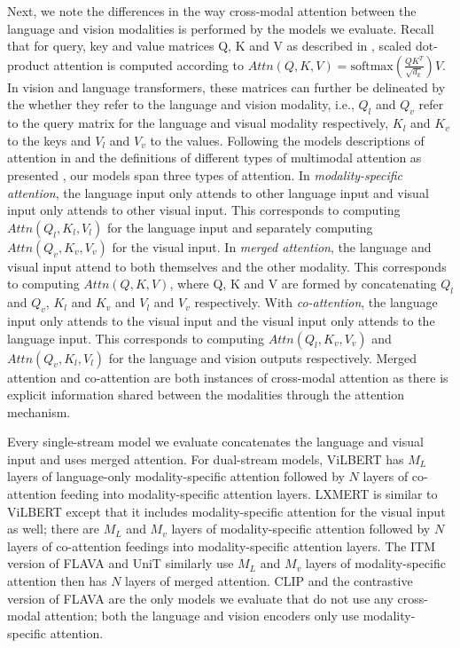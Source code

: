 \documentclass[10pt,twocolumn,letterpaper]{article}
\begin{document}
Next, we note the differences in the way cross-modal attention between the language and vision modalities is performed by the models we evaluate.
Recall that for query, key and value matrices Q, K and V as described in \cite{vaswani2017attention}, scaled dot-product attention is computed according to $Attn(Q, K, V) = \text{softmax} \left( \frac{QK^{T}}{\sqrt{d_{k}}} \right) V$.
In vision and language transformers, these matrices can further be delineated by the whether they refer to the language and vision modality, i.e., $Q_{l}$ and $Q_{v}$ refer to the query matrix for the language and visual modality respectively, $K_{l}$ and $K_{v}$ to the keys and $V_{l}$ and $V_{v}$ to the values.
Following the models descriptions of attention in \cite{vaswani2017attention} and the definitions of different types of multimodal attention as presented \cite{hendricks2021decoupling}, our models span three types of attention. In \textit{modality-specific attention}, the language input only attends to other language input and visual input only attends to other visual input. This corresponds to computing $Attn(Q_{l}, K_{l}, V_{l})$ for the language input and separately computing $Attn(Q_{v}, K_{v}, V_{v})$ for the visual input. In \textit{merged attention}, the language and visual input attend to both themselves and the other modality. This corresponds to computing $Attn(Q, K, V)$, where Q, K and V are formed by concatenating $Q_{l}$ and $Q_{v}$, $K_{l}$ and $K_{v}$ and $V_{l}$ and $V_{v}$ respectively. With \textit{co-attention}, the language input only attends to the visual input and the visual input only attends to the language input. This corresponds to computing $Attn(Q_{l}, K_{v}, V_{v})$ and $Attn(Q_{v}, K_{l}, V_{l})$ for the language and vision outputs respectively. Merged attention and co-attention are both instances of cross-modal attention as there is explicit information shared between the modalities through the attention mechanism.


Every single-stream model we evaluate concatenates the language and visual input and uses merged attention.
For dual-stream models, ViLBERT has $M_{L}$ layers of language-only modality-specific attention followed by $N$ layers of co-attention feeding into modality-specific attention layers.
LXMERT is similar to ViLBERT except that it includes modality-specific attention for the visual input as well; there are $M_{L}$ and $M_{v}$ layers of modality-specific attention followed by $N$ layers of co-attention feedings into modality-specific attention layers.
The ITM version of FLAVA and UniT similarly use $M_{L}$ and $M_{v}$ layers of modality-specific attention then has $N$ layers of merged attention.
CLIP and the contrastive version of FLAVA are the only models we evaluate that do not use any cross-modal attention; both the language and vision encoders only use modality-specific attention.
\fi
\end{document}

